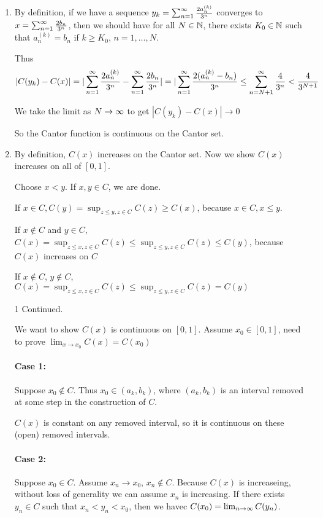 \documentclass[x11names,reqno,14pt]{extarticle}
\newcommand{\seq}[2][\oo]{_{#2 = 1}^#1}
\begin{document}
\begin{enumerate}

\item By definition, if we have a sequence $y_k = \sum\seq{n}\frac{2a_n^{(k)}}{3^n}$ converges to $x = \sum\seq{n}\frac{2b_n}{3^n}$, then we should have for all $N \in \mathbb{N}$, there exists $K_0 \in \mathbb{N}$ such that $a_n^{(k)} = b_n$ if $k \geq K_0$, $n = 1, \dots, N$. 

Thus 
\[
|C(y_k) - C(x)|=|\sum\seq{n}\frac{2a_n^{(k)}}{3^n} - \sum\seq{n}\frac{2b_n}{3^n}| = |\sum\seq{n}\frac{2(a_n^{(k)} - b_n)}{3^n} \leq \sum_{n = N + 1}^\oo \frac{4}{3^n} < \frac{4}{3^{N + 1}}
\]

We take the limit as $N \to \infty$ to get $|C(y_k) - C(x)| \to 0$

So the Cantor function is continuous on the Cantor set. 

\item By definition, $C(x)$ increases on the Cantor set. Now we show $C(x)$ increases on all of $[0, 1]$. 

Choose $x < y$. If $x, y \in C$, we are done. 

If $x \in C, C(y) = \sup_{z\leq y, z \in C}C(z) \geq C(x)$, because $x \in C, x \leq y$. 

If $x \not\in C$ and $y \in C,$ $C(x) = \sup_{z\leq x, z \in C}C(z) \leq \sup_{z\leq y, z \in C}C(z) \leq C(y)$, because $C(x)$ increases on $C$

If $x\not\in C$, $y\not\in C$, $C(x) = \sup_{z\leq x, z \in C}C(z) \leq \sup_{z\leq y, z \in C}C(z) = C(y)$

\item[1] Continued.

We want to show $C(x)$ is continuous on $[0,1]$. Assume $x_0 \in [0,1]$, need to prove $\lim_{x\to x_0}C(x) = C(x_0)$

\paragraph{Case 1:} Suppose $x_0\not\in C$. Thus $x_0 \in (a_k, b_k)$, where $(a_k, b_k)$ is an interval removed at some step in the construction of $C$. 

$C(x)$ is constant on any removed interval, so it is continuous on these (open) removed intervals. 

\paragraph{Case 2:} Suppose $x_0 \in C$. Assume $x_n \to x_0$, $x_n\not\in C$. Because $C(x)$ is increaseing, without loss of generality we can assume $x_n$ is increasing. If there exists $y_n \in C$ such that $x_n < y_n < x_0$, then we havec $C(x_0) = \lim_{n\to\infty}C(y_n)$. 


\end{enumerate}
\end{document}
